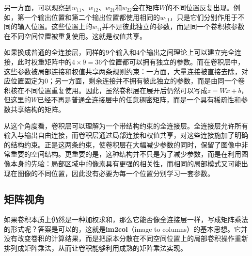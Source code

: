 另一方面，可以观察到$w_{11}$、$w_{12}$、$w_{21}$和$w_{22}$会在矩阵$W$的不同位置反复出现。例如，第一个输出位置和第二个输出位置都使用相同的$w_{11}$，只是它们分别作用于不同的输入位置。这些位置上的$w_{11}$并不是彼此独立的参数，而是同一个卷积核参数在不同空间位置被重复使用。这就是权值共享。

如果换成普通的全连接层，同样的$9$个输入和$4$个输出之间理论上可以建立完全连接，此时权重矩阵中的$4\times9=36$个位置都可以拥有独立的参数。而在卷积层中，这些参数被局部连接和权值共享两条规则约束：一方面，大量连接被直接去除，对应位置固定为$0$；另一方面，剩余连接并不拥有彼此独立的参数，而是由同一个卷积核在不同位置重复使用。因此，虽然卷积层在展开后仍然可以写成$z=Wx+b$，但这里的$W$已经不再是普通全连接层中的任意稠密矩阵，而是一个具有稀疏性和参数共享结构的矩阵。

从这个角度看，卷积层可以理解为一个带结构约束的全连接层。全连接层允许所有输入与输出自由连接，而卷积层通过局部连接和权值共享，对这些连接施加了明确的结构约束。正是这两条约束，使卷积层在大幅减少参数的同时，保留了图像中非常重要的空间结构。更重要的是，这种结构并不只是为了减少参数，而是在利用图像本身的先验：局部区域中的像素具有更强的相关性，而相同的局部模式又可能出现在图像的不同位置，因此没有必要为每一个位置分别学习一套参数。

\subsection{矩阵视角}

如果卷积本质上仍然是一种加权求和，那么它能否像全连接层一样，写成矩阵乘法的形式呢？答案是可以的，这就是\textbf{im2col}（image to columns）的基本思想。它并没有改变卷积的计算结果，而是把原本分散在不同空间位置上的局部卷积操作重新排列成矩阵乘法，从而让卷积能够利用成熟的矩阵乘法实现。

